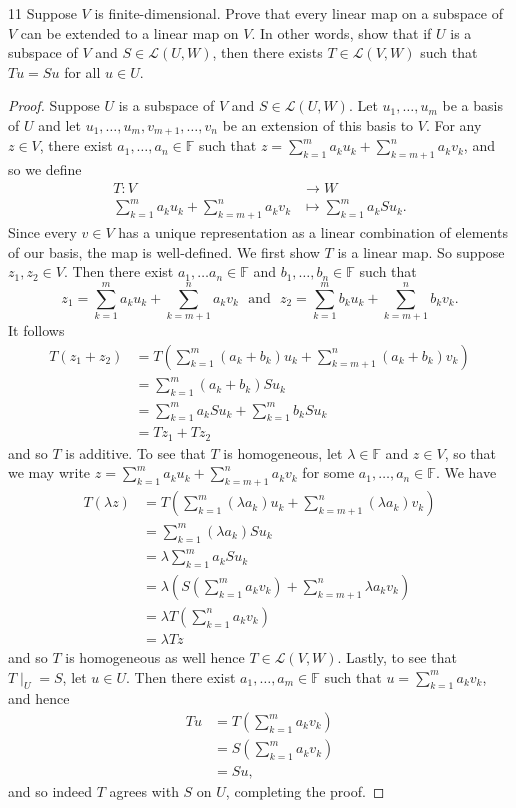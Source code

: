 \documentclass{extarticle}
\newenvironment{problem}[1]{\begin{prob*}{#1}{}}{\end{prob*}}
\newcommand{\F}{\mathbb{F}}
\newcommand{\Hom}{\mathcal{L}}
\begin{document}
\begin{problem}{11}
Suppose $V$ is finite-dimensional.  Prove that every linear map on a subspace of $V$ can be extended to a linear map on $V$.  In other words, show that if $U$ is a subspace of $V$ and $S\in\Hom(U,W)$, then there exists $T\in\Hom(V,W)$ such that $Tu = Su$ for all $u\in U$.
\end{problem}
\begin{proof}
Suppose $U$ is a subspace of $V$ and $S\in\Hom(U,W)$.  Let $u_1,\dots, u_m$ be a basis of $U$ and let $u_1,\dots, u_m, v_{m+1},\dots, v_n$ be an extension of this basis to $V$.  For any $z\in V$, there exist $a_1,\dots, a_n\in\F$ such that $z =\sum_{k=1}^ma_ku_k + \sum_{k=m+1}^na_kv_k$, and so we define 
\begin{align*}
T: V &\to W\\
    \sum_{k = 1}^m a_ku_k + \sum_{k = m+1}^n a_kv_k &\mapsto \sum_{k = 1}^m a_kSu_k.
\end{align*}
Since every $v\in V$ has a unique representation as a linear combination of elements of our basis, the map is well-defined.  We first show $T$ is a linear map.  So suppose $z_1,z_2\in V$.  Then there exist $a_1,\dots a_n\in \F$ and $b_1,\dots, b_n\in\F$ such that 
\begin{equation*}
z_1 = \sum_{k=1}^ma_ku_k + \sum_{k=m+1}^na_kv_k ~~~\text{and}~~~ z_2 = \sum_{k=1}^mb_ku_k + \sum_{k=m+1}^nb_kv_k.
\end{equation*}
It follows
\begin{align*}
T(z_1 + z_2) &= T\left(\sum_{k=1}^m(a_k + b_k)u_k + \sum_{k=m+1}^n(a_k + b_k)v_k\right)\\
&= \sum_{k=1}^m(a_k + b_k)Su_k\\
&= \sum_{k=1}^ma_kSu_k + \sum_{k=1}^mb_kSu_k\\
&= Tz_1 + Tz_2
\end{align*}
and so $T$ is additive.  To see that $T$ is homogeneous, let $\lambda \in\F$ and $z\in V$, so that we may write $z =\sum_{k=1}^ma_ku_k + \sum_{k=m+1}^na_kv_k$ for some $a_1,\dots,a_n\in\F$. We have
\begin{align*}
T(\lambda z) &= T\left(\sum_{k=1}^m(\lambda a_k)u_k + \sum_{k=m+1}^n(\lambda a_k)v_k\right)\\
&= \sum_{k=1}^m(\lambda a_k)Su_k\\
&= \lambda\sum_{k=1}^ma_kSu_k\\
&= \lambda\left(S\left(\sum_{k=1}^ma_kv_k\right) + \sum_{k=m+1}^n\lambda a_kv_k\right)\\
&= \lambda T\left(\sum_{k=1}^na_kv_k\right)\\
&= \lambda Tz
\end{align*}
and so $T$ is homogeneous as well hence $T\in\Hom(V,W)$.  Lastly, to see that $T\mid_U = S$, let $u\in U$.  Then there exist $a_1,\dots, a_m\in\F$ such that $u=\sum_{k=1}^ma_kv_k$, and hence
\begin{align*}
Tu &= T\left( \sum_{k=1}^ma_kv_k\right)\\
&= S\left(\sum_{k=1}^ma_kv_k\right)\\
&= Su,
\end{align*}
and so indeed $T$ agrees with $S$ on $U$, completing the proof.
\end{proof}
\end{document}
